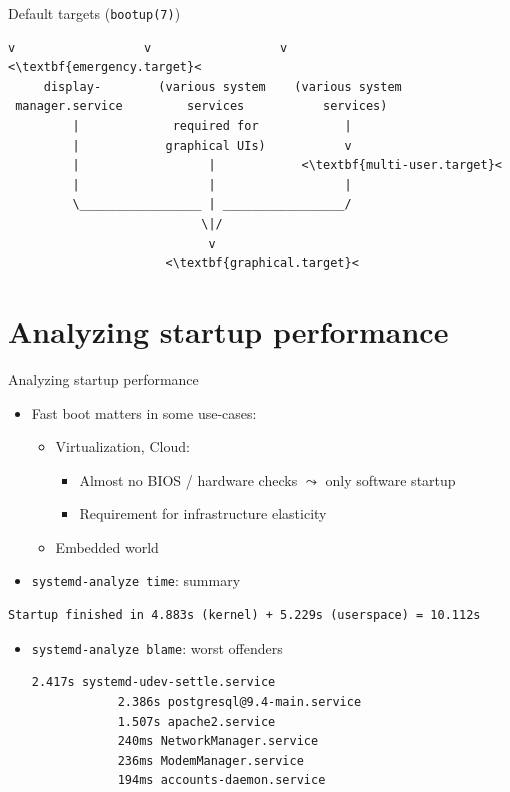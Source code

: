 \documentclass[11pt,final,usepdftitle=false]{beamer}
\begin{document}
\begin{frame}[fragile]{Default targets (\texttt{bootup(7)})}
\begin{center}
\begin{adjustbox}{height=0.45\textheight,keepaspectratio}
\begin{lstlisting}[basicstyle=\ttfamily\tiny,escapeinside={<<}]
         v                  v                  v                                  <\textbf{emergency.target}<
     display-        (various system    (various system
 manager.service         services           services)
         |             required for            |
         |            graphical UIs)           v
         |                  |            <\textbf{multi-user.target}<
         |                  |                  |
         \_________________ | _________________/
                           \|/
                            v
                      <\textbf{graphical.target}<
\end{lstlisting}
\end{adjustbox}
\end{center}
\end{frame}

\section{Analyzing startup performance}

\begin{frame}[fragile]{Analyzing startup performance}
	\begin{itemize}
		\item Fast boot matters in some use-cases:

			\begin{itemize}
				\item Virtualization, Cloud:
					\begin{itemize}
						\item Almost no BIOS / hardware checks $\leadsto$ only software startup
							\hbr
						\item Requirement for infrastructure elasticity
					\end{itemize}
					\hbr
				\item Embedded world
			\end{itemize}
			\hbr
		\item \texttt{systemd-analyze time}: summary
	\end{itemize}
	\begin{lstlisting}[basicstyle=\ttfamily\scriptsize,escapeinside={||}]
	Startup finished in 4.883s (kernel) + 5.229s (userspace) = 10.112s
	\end{lstlisting}
	\begin{itemize}
			\hbr
		\item \texttt{systemd-analyze blame}: worst offenders
			\begin{lstlisting}[basicstyle=\ttfamily\normalsize,escapeinside={||}]
			2.417s systemd-udev-settle.service
			2.386s postgresql@9.4-main.service
			1.507s apache2.service
			240ms NetworkManager.service
			236ms ModemManager.service
			194ms accounts-daemon.service
			\end{lstlisting}
	\end{itemize}
\end{frame}
\end{document}
